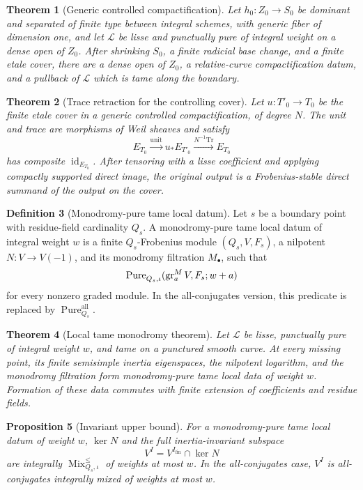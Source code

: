 \documentclass[10pt]{article}
\newtheorem{theorem}{Theorem}[section]
\newtheorem{proposition}[theorem]{Proposition}
\theoremstyle{definition}
\newtheorem{definition}[theorem]{Definition}
\newcommand{\MixLe}{\operatorname{Mix}^{\leq}}
\newcommand{\Pure}{\operatorname{Pure}}
\newcommand{\gr}{\operatorname{gr}}
\begin{document}
\begin{theorem}[Generic controlled compactification]
Let \(h_0:Z_0\to S_0\) be dominant and separated of finite type between
integral schemes, with generic fiber of dimension one, and let
\(\mathcal L\) be lisse and punctually pure of integral weight on a dense
open of \(Z_0\).  After shrinking \(S_0\), a finite radicial base change,
and a finite etale cover, there are a dense open of \(Z_0\), a
relative-curve compactification datum, and a pullback of \(\mathcal L\)
which is tame along the boundary.
\end{theorem}

\begin{theorem}[Trace retraction for the controlling cover]
Let \(u:T'_0\to T_0\) be the finite etale cover in a generic controlled
compactification, of degree \(N\).  The unit and trace are morphisms of Weil
sheaves and satisfy
\[
 E_{T_0}\xrightarrow{\mathrm{unit}}u_*E_{T'_0}
 \xrightarrow{N^{-1}\mathrm{Tr}}E_{T_0}
\]
has composite \(\operatorname{id}_{E_{T_0}}\).
After tensoring with a lisse coefficient and applying compactly supported
direct image, the original output is a Frobenius-stable direct summand of
the output on the cover.
\end{theorem}

\begin{definition}[Monodromy-pure tame local datum]
Let \(s\) be a boundary point with residue-field cardinality \(Q_s\).  A
monodromy-pure tame local datum of integral weight \(w\) is a finite
\(Q_s\)-Frobenius module \((Q_s,V,F_s)\), a nilpotent
\(N:V\to V(-1)\), and its monodromy filtration \(M_\bullet\), such that
\[
 \Pure_{Q_s,\iota}^{\vphantom{A}}
       (\gr_a^MV,F_s;w+a)
\]
for every nonzero graded module.  In the all-conjugates version, this
predicate is replaced by \(\Pure_{Q_s}^{\mathrm{all}}\).
\end{definition}

\begin{theorem}[Local tame monodromy theorem]
Let \(\mathcal L\) be lisse, punctually pure of integral weight \(w\), and
tame on a punctured smooth curve.  At every missing point, its finite
semisimple inertia eigenspaces, the nilpotent logarithm, and the monodromy
filtration form monodromy-pure tame local data of weight \(w\).  Formation
of these data commutes with finite extension of coefficients and residue
fields.
\end{theorem}

\begin{proposition}[Invariant upper bound]
For a monodromy-pure tame local datum of weight \(w\),
\(\ker N\) and the full inertia-invariant subspace
\[
                    V^I=V^{I_{\mathrm{fin}}}\cap\ker N
\]
are integrally
\(\MixLe_{Q_s,\iota}\) of weights at most \(w\).  In the all-conjugates
case, \(V^I\) is all-conjugates integrally mixed of weights at most \(w\).
\end{proposition}
\end{document}
